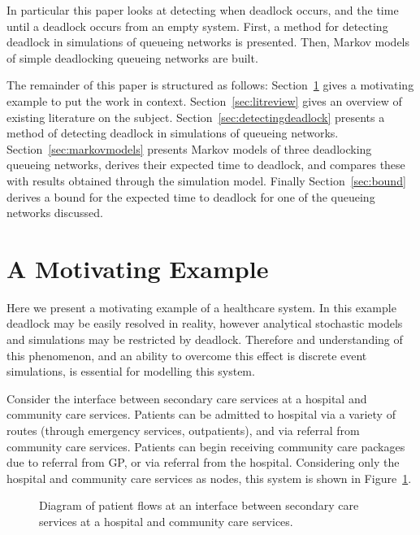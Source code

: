 \documentclass{article}
\numberwithin{equation}{section}
\begin{document}
In particular this paper looks at detecting when deadlock occurs, and the time
until a deadlock occurs from an empty system.
First, a method for detecting deadlock in simulations of queueing networks is
presented.
Then, Markov models of simple deadlocking queueing networks are built.

The remainder of this paper is structured as follows:
Section~\ref{sec:motivatingexample} gives a motivating example to put the work
in context.
Section~\ref{sec:litreview} gives an overview of existing literature on the
subject.
Section~\ref{sec:detectingdeadlock} presents a method of detecting deadlock in
simulations of queueing networks.
Section~\ref{sec:markovmodels} presents Markov models of three deadlocking
queueing networks, derives their expected time to deadlock, and compares these
with results obtained through the simulation model.
Finally Section~\ref{sec:bound} derives a bound for the expected time to
deadlock for one of the queueing networks discussed.




\section{A Motivating Example}\label{sec:motivatingexample}

Here we present a motivating example of a healthcare system.
In this example deadlock may be easily resolved in reality, however analytical
stochastic models and simulations may be restricted by deadlock.
Therefore and understanding of this phenomenon, and an ability to overcome
this effect is discrete event simulations, is essential for modelling this
system.

Consider the interface between secondary care services at a hospital and
community care services.
Patients can be admitted to hospital via a variety of routes (through
emergency services, outpatients), and via referral from community care
services.
Patients can begin receiving community care packages due to referral from GP,
or via referral from the hospital.
Considering only the hospital and community care services as nodes, this
system is shown in Figure~\ref{fig:motivatingexample}.

\begin{figure}
\begin{center}

\end{center}
\caption{Diagram of patient flows at an interface between secondary care
services at a hospital and community care services.}
\label{fig:motivatingexample}
\end{figure}
\end{document}
